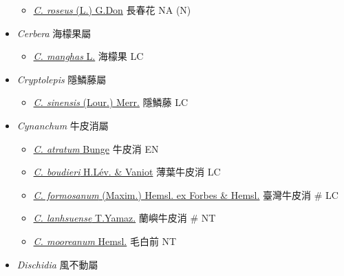 \begin{itemize}
  \begin{itemize}
        \item[] \href{http://www.theplantlist.org/tpl1.1/search?q=Catharanthus+roseus}{\textit{C. roseus} (L.) G.Don}   長春花   NA (N)
  \end{itemize}
 \item[] \textit{Cerbera} 海檬果屬
                                
  \begin{itemize}
        \item[] \href{http://www.theplantlist.org/tpl1.1/search?q=Cerbera+manghas}{\textit{C. manghas} L.}   海檬果   LC
  \end{itemize}
 \item[] \textit{Cryptolepis} 隱鱗藤屬
                                
  \begin{itemize}
        \item[] \href{http://www.theplantlist.org/tpl1.1/search?q=Cryptolepis+sinensis}{\textit{C. sinensis} (Lour.) Merr.}   隱鱗藤   LC
  \end{itemize}
 \item[] \textit{Cynanchum} 牛皮消屬
                                
  \begin{itemize}
        \item[] \href{http://www.theplantlist.org/tpl1.1/search?q=Cynanchum+atratum}{\textit{C. atratum} Bunge}   牛皮消   EN
        \item[] \href{http://www.theplantlist.org/tpl1.1/search?q=Cynanchum+boudieri}{\textit{C. boudieri} H.Lév. \& Vaniot}   薄葉牛皮消   LC
        \item[] \href{http://www.theplantlist.org/tpl1.1/search?q=Cynanchum+formosanum}{\textit{C. formosanum} (Maxim.) Hemsl. ex Forbes \& Hemsl.}   臺灣牛皮消  \# LC
        \item[] \href{http://www.theplantlist.org/tpl1.1/search?q=Cynanchum+lanhsuense}{\textit{C. lanhsuense} T.Yamaz.}   蘭嶼牛皮消  \# NT
        \item[] \href{http://www.theplantlist.org/tpl1.1/search?q=Cynanchum+mooreanum}{\textit{C. mooreanum} Hemsl.}   毛白前   NT
  \end{itemize}
 \item[] \textit{Dischidia} 風不動屬
                                

\end{itemize}
